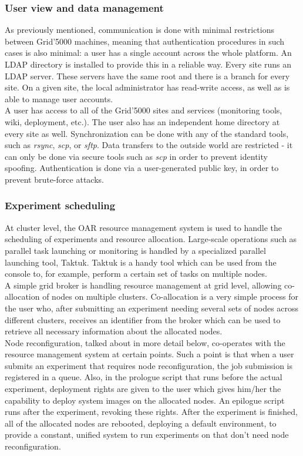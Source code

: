 \subsubsection{User view and data management}
As previously mentioned, communication is done with minimal
restrictions between Grid'5000 machines, meaning that authentication
procedures in such cases is also minimal: a user has a single account
across the whole platform. An LDAP directory is installed to provide
this in a reliable way. Every site runs an LDAP server. These servers
have the same root and there is a branch for every site. On a given
site, the local administrator has read-write access, as well as is
able to manage user accounts.\\
A user has access to all of the Grid'5000 sites and services
(monitoring tools, wiki, deployment, etc.). The user also has an
independent home directory at every site as well. Synchronization can
be done with any of the standard tools, such as \emph{rsync},
\emph{scp}, or \emph{sftp}. Data transfers to the outside world are
restricted - it can only be done via secure tools such as \emph{scp}
in order to prevent identity spoofing. Authentication is done via a
user-generated public key, in order to prevent brute-force attacks.
\subsubsection{Experiment scheduling}
At cluster level, the OAR\cite{xdghmmnr05} resource management system is
used to handle the scheduling of experiments and resource
allocation. Large-scale operations such as parallel task launching or
monitoring is handled by a specialized parallel launching tool,
Taktuk\cite{chr09}. Taktuk is a handy tool which can be used from the
console to, for example, perform a certain set of tasks on multiple
nodes.\\
A simple grid broker is handling resource management at grid
level, allowing co-allocation of nodes on multiple
clusters. Co-allocation is a very simple process for the user who,
after submitting an experiment needing several sets of nodes across
different clusters, receives an identifier from the broker which can
be used to retrieve all necessary information about the allocated
nodes.\\
Node reconfiguration, talked about in more detail below, co-operates
with the resource management system at certain points. Such a point is
that when a user submits an experiment that requires node
reconfiguration, the job submission is registered in a queue. Also, in
the prologue script that runs before the actual experiment, deployment
rights are given to the user which gives him/her the capability to
deploy system images on the allocated nodes. An epilogue script runs
after the experiment, revoking these rights. After the experiment is
finished, all of the allocated nodes are rebooted, deploying a default
environment, to provide a constant, unified system to run experiments
on that don't need node reconfiguration.
